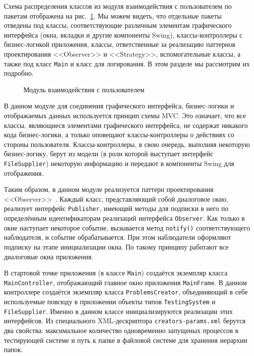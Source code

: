 Схема распределения классов из модуля взаимодействия с пользователем по пакетам отображена на рис.~\ref{package_diagram_interaction}. Мы можем видеть, что отдельные пакеты отведены под классы, соответствующие различным элементам графического интерфейса (окна, вкладки и другие компоненты Swing), классы-контроллеры с бизнес-логикой приложения, классы, ответственные за реализацию паттернов проектирования <<Observer>> и <<Strategy>>, вспомогательные классы, а также под класс \texttt{Main} и класс для логирования. В этом разделе мы рассмотрим их подробно.

\begin{figure}[h]
\caption{Модуль взаимодействия с пользователем}
\label{package_diagram_interaction}
\end{figure}

В данном модуле для соединения графического интерфейса, бизнес-логики и отображаемых данных используется принцип схемы MVC. Это означает, что все классы, являющиеся элементами графического интерфейса, не содержат никакого кода бизнес-логики, а только оповещают классы-контроллеры о действиях со стороны пользователя. Классы-контроллеры, в свою очередь, выполняя некоторую бизнес-логику, берут из модели (в роли которой выступает интерфейс \texttt{File\-Supplier}) некоторую информацию и передают в компоненты Swing для отображения.

Таким образом, в данном модуле реализуется паттерн проектирования <<Ob\-ser\-ver>>~\cite{gamma}. Каждый класс, представляющий собой диалоговое окно, реализует интерфейс \texttt{Publisher}, имеющий методы для подписки в него по определённым идентификаторам реализаций интерфейса \texttt{Observer}. Как только в окне наступает некоторое событие, вызывается метод \texttt{notify()} соответствующего наблюдателя, и событие обрабатывается. При этом наблюдатели оформляют подписку на этапе инициализации окна. По такому принципу работают все диалоговые окна приложения.

В стартовой точке приложения (в классе \texttt{Main}) создаётся экземпляр класса \texttt{Main\-Controller}, отображающий главное окно приложения \texttt{Main\-Frame}. В данном контроллере создаётся экземпляр класса \texttt{Problems\-Creator}, объединяющий в себе используемые повсюду в приложении объекты типов \texttt{Testing\-System} и \texttt{File\-Supplier}. Именно в данном классе инициализируются реализации этих интерфейсов. Из специального XML-дескриптора \texttt{creators-pa\-rams.xml} берутся два свойства: максимальное количество одновременно запущеных процессов в тестирующей системе и путь к папке в файловой системе для хранения иерархии папок.

